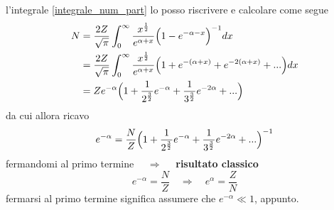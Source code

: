 l'integrale \ref{integrale_num_part} lo posso riscrivere e calcolare come segue 
\begin{equation}
\begin{split}
N & = \frac{2Z}{\sqrt{\pi}} \int_0^{\infty} \frac{x^{ \frac{1}{2} }}{e^{ \alpha + x }} \Bigl(  1 - e^{ - \alpha - x }  \Bigr)^{ -1 } dx \\ 
& = \frac{2Z}{\sqrt{\pi}} \int_0^{\infty} \frac{x^{ \frac{1}{2} }}{e^{ \alpha + x }} \Bigl(  1 + e^{ - (\alpha + x) } + e^{ - 2 (\alpha + x) } + ...   \Bigr)
dx \\ &= Z e^{ -\alpha } \Bigl(  1 + \frac{1}{2^{\frac{3}{2}}}e^{ -\alpha } + \frac{1}{3^{\frac{3}{2}}} e^{ -2\alpha } + ...  \Bigr)
\end{split}
\end{equation}
da cui allora ricavo
\begin{equation}
e^{ -\alpha } = \frac{N}{Z} \Bigl(  1 + \frac{1}{2^{\frac{3}{2}}}e^{ -\alpha } + \frac{1}{3^{\frac{3}{2}}} e^{ -2\alpha } + ...  \Bigr)^{ -1 }
\end{equation}
fermandomi al primo termine $\quad\Rightarrow\quad $ \textbf{risultato classico}
\begin{equation}
e^{ -\alpha } = \frac{N}{Z} \quad\Rightarrow\quad e^{ \alpha } = \frac{Z}{N}
\end{equation}
fermarsi al primo termine significa assumere che $e^{ -\alpha } \ll 1$, appunto.


